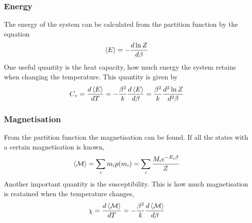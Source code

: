 \documentclass[11pt,a4paper,english]{article}
\numberwithin{equation}{section}
\newcommand{\magM}{\mathcal{M}}
\begin{document}
\subsubsection{Energy}
The energy of the system can be calculated from the partition function
by the equation
\begin{gather}
\expval{E} = -\frac{d \ln Z}{d \beta}
\end{gather}
One useful quantity is the heat capacity, how much energy the system 
retains when changing the temperature. This quantity is given by
\begin{gather}
C_v = \frac{d\expval{E}}{dT} 
= -\frac{\beta^2}{k}\frac{d\expval{E}}{d\beta}
 = \frac{\beta^2}{k}\frac{d^2\ln Z}{d^2\beta}
\end{gather}



\subsubsection{Magnetisation}
From the partition function the magnetisation can be found. If all the 
states with a certain magnetisation is known, 
\begin{gather}
\expval{\magM} = \sum_i m_i p(m_i) = \sum_i \frac{M_i e^{-E_i\beta}}{Z}
\end{gather}
Another important quantity is the susceptibility. This is how much 
magnetisation is reatained when the temperature changes,
\begin{gather}
\chi = \frac{d \expval{\magM}}{d T} 
= -\frac{\beta^2}{k}\frac{d\expval{\magM}}{d\beta}
\end{gather}
\end{document}
